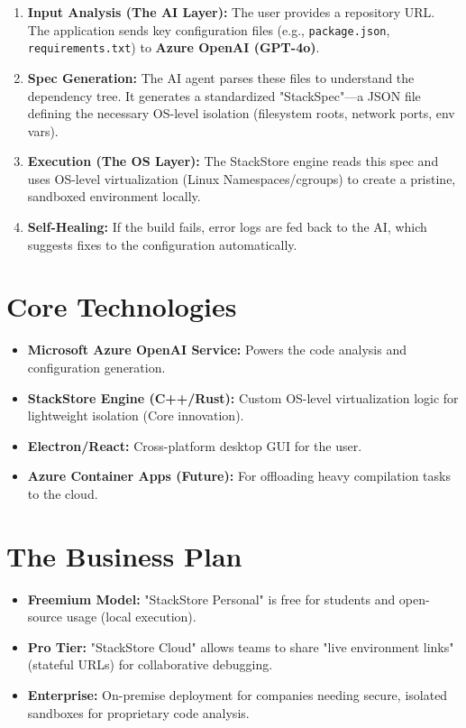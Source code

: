\documentclass[a4paper,12pt]{article}
\begin{document}
\begin{enumerate}
    \item \textbf{Input Analysis (The AI Layer):} The user provides a repository URL. The application sends key configuration files (e.g., \texttt{package.json}, \texttt{requirements.txt}) to \textbf{Azure OpenAI (GPT-4o)}.
    \item \textbf{Spec Generation:} The AI agent parses these files to understand the dependency tree. It generates a standardized "StackSpec"---a JSON file defining the necessary OS-level isolation (filesystem roots, network ports, env vars).
    \item \textbf{Execution (The OS Layer):} The StackStore engine reads this spec and uses OS-level virtualization (Linux Namespaces/cgroups) to create a pristine, sandboxed environment locally.
    \item \textbf{Self-Healing:} If the build fails, error logs are fed back to the AI, which suggests fixes to the configuration automatically.
\end{enumerate}

\section{Core Technologies}
\begin{itemize}
    \item \textbf{Microsoft Azure OpenAI Service:} Powers the code analysis and configuration generation.
    \item \textbf{StackStore Engine (C++/Rust):} Custom OS-level virtualization logic for lightweight isolation (Core innovation).
    \item \textbf{Electron/React:} Cross-platform desktop GUI for the user.
    \item \textbf{Azure Container Apps (Future):} For offloading heavy compilation tasks to the cloud.
\end{itemize}

\section{The Business Plan}
\begin{itemize}
    \item \textbf{Freemium Model:} "StackStore Personal" is free for students and open-source usage (local execution).
    \item \textbf{Pro Tier:} "StackStore Cloud" allows teams to share "live environment links" (stateful URLs) for collaborative debugging.
    \item \textbf{Enterprise:} On-premise deployment for companies needing secure, isolated sandboxes for proprietary code analysis.
\end{itemize}
\end{document}
